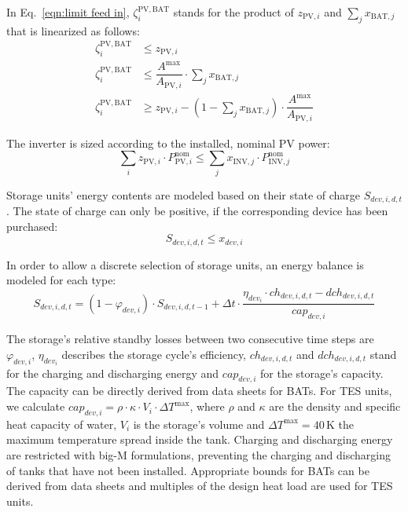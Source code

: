 In Eq.~\ref{eqn:limit feed in}, $\zeta^{\mathrm{PV,BAT}}_i$ stands for the product of $z_{\mathrm{PV,}i}$ and $\sum\limits_{j} x_{\mathrm{BAT,}j}$ that is linearized as follows:
\begin{align}
	\zeta^{\mathrm{PV,BAT}}_i &\le z_{\mathrm{PV,}i}\\
	\zeta^{\mathrm{PV,BAT}}_i &\le \dfrac{A^{\mathrm{max}}}{A_{\mathrm{PV,}i}} \cdot \sum\limits_{j} x_{\mathrm{BAT,}j}\\
	\zeta^{\mathrm{PV,BAT}}_i &\ge z_{\mathrm{PV,}i} - \left(1- \sum\limits_{j} x_{\mathrm{BAT,}j}\right) \cdot \dfrac{A^{\mathrm{max}}}{A_{\mathrm{PV,}i}}
\end{align}

The inverter is sized according to the installed, nominal PV power:
\begin{equation}
	\sum\limits_{i} z_{\mathrm{PV,}i} \cdot P^\mathrm{nom}_{\mathrm{PV,}i} \le \sum\limits_{j} x_{\mathrm{INV,}j} \cdot P^\mathrm{nom}_{\mathrm{INV,}j}
\end{equation}

Storage units' energy contents are modeled based on their state of charge $S_{dev,i,d,t}$.
The state of charge can only be positive, if the corresponding device has been purchased:
\begin{equation}
	S_{dev,i,d,t} \le x_{dev,i}
\end{equation}

In order to allow a discrete selection of storage units, an energy balance is modeled for each type:
\begin{equation}
	S_{dev,i,d,t} = \left(1-\varphi_{dev,i}\right) \cdot S_{dev,i,d,t-1} + \Delta t \cdot \dfrac{\eta_{dev_i} \cdot ch_{dev,i,d,t} - dch_{dev,i,d,t}}{cap_{dev,i}}
	\label{eqn:soc_storages}
\end{equation}

The storage's relative standby losses between two consecutive time steps are $\varphi_{dev,i}$, $\eta_{dev_i}$ describes the storage cycle's efficiency, $ch_{dev,i,d,t}$ and $dch_{dev,i,d,t}$ stand for the charging and discharging energy and $cap_{dev,i}$ for the storage's capacity.
The capacity can be directly derived from data sheets for BATs.
For TES units, we calculate $cap_{dev,i}=\rho \cdot \kappa\cdot V_i \cdot \Delta T^\mathrm{max}$, where $\rho$ and $\kappa$ are the density and specific heat capacity of water, $V_i$ is the storage's volume and $\Delta T^\mathrm{max}=40\,\mathrm{K}$ the maximum temperature spread inside the tank.
Charging and discharging energy are restricted with big-M formulations, preventing the charging and discharging of tanks that have not been installed.
Appropriate bounds for BATs can be derived from data sheets and multiples of the design heat load are used for TES units.

